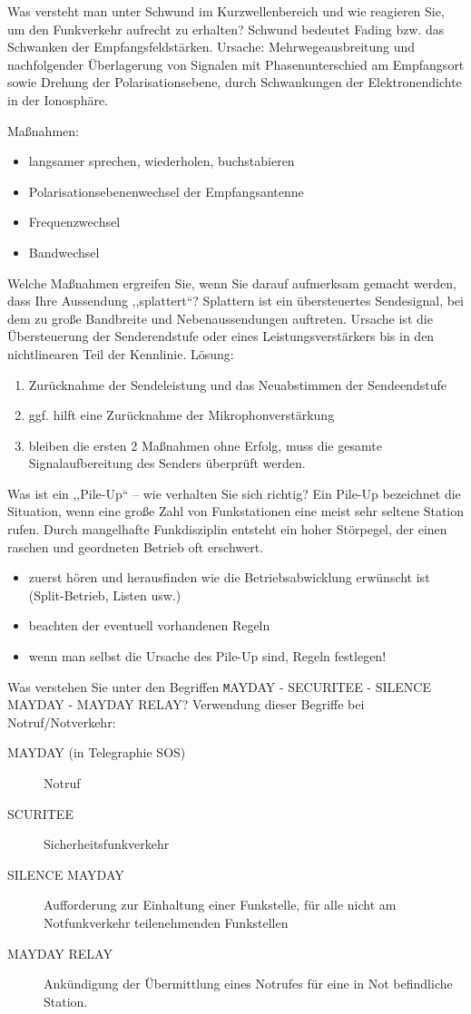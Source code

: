 \documentclass[avery5371,grid,frame,a4paper]{flashcards}
\newcommand{\card}[3]{
  \begin{flashcard}[{\chap} -- #1]{#2}#3\end{flashcard}
}
\begin{document}
\card{44}{Was versteht man unter Schwund im Kurzwellenbereich und wie reagieren Sie, um den Funkverkehr aufrecht zu erhalten?}{
  \small
  Schwund bedeutet Fading bzw. das Schwanken der Empfangsfeldstärken. Ursache: Mehrwegeausbreitung und nachfolgender Überlagerung von Signalen mit Phasenunterschied am Empfangsort sowie Drehung der Polarisationsebene, durch Schwankungen der Elektronendichte in der Ionosphäre.

  Maßnahmen:
  \begin{itemize}
    \item langsamer sprechen, wiederholen, buchstabieren
    \item Polarisationsebenenwechsel der Empfangsantenne
    \item Frequenzwechsel
    \item Bandwechsel
  \end{itemize}
}
\card{45}{Welche Maßnahmen ergreifen Sie, wenn Sie darauf aufmerksam gemacht werden, dass Ihre Aussendung ,,splattert``?}{
  \footnotesize
  Splattern ist ein übersteuertes Sendesignal, bei dem zu große Bandbreite und Nebenaussendungen auftreten. Ursache ist die Übersteuerung der Senderendstufe oder eines Leistungsverstärkers bis in den  nichtlinearen Teil der Kennlinie. Lösung:
  \begin{enumerate}
    \item Zurücknahme der Sendeleistung und das Neuabstimmen der Sendeendstufe
    \item ggf. hilft eine Zurücknahme der Mikrophonverstärkung
    \item bleiben die ersten 2 Maßnahmen ohne Erfolg, muss die gesamte Signalaufbereitung des Senders überprüft werden.
  \end{enumerate}
}
\card{46}{Was ist ein ,,Pile-Up`` -- wie verhalten Sie sich richtig?}{
  \small
  Ein Pile-Up bezeichnet die Situation, wenn eine große Zahl von Funkstationen eine meist sehr seltene Station rufen. Durch mangelhafte Funkdisziplin entsteht ein hoher Störpegel, der einen raschen und geordneten Betrieb oft erschwert.
  \begin{itemize}
    \item zuerst hören und herausfinden wie die Betriebsabwicklung erwünscht ist (Split-Betrieb, Listen usw.)
    \item beachten der eventuell vorhandenen Regeln
    \item wenn man selbst die Ursache des Pile-Up  sind, Regeln festlegen!
  \end{itemize}
}
\card{47}{Was verstehen Sie unter den Begriffen {\footnotesize\texttt MAYDAY - SECURITEE - SILENCE MAYDAY - MAYDAY RELAY?}}{
  \small
  Verwendung dieser Begriffe bei Notruf/Notverkehr:
  \begin{description}
    \item[MAYDAY (in Telegraphie SOS)] Notruf
    \item[SCURITEE] Sicherheitsfunkverkehr
    \item[SILENCE MAYDAY] Aufforderung zur Einhaltung einer Funkstelle, für alle nicht am Notfunkverkehr teilenehmenden Funkstellen
    \item[MAYDAY RELAY] Ankündigung der Übermittlung eines Notrufes für eine in Not befindliche Station.
  \end{description}
}
\end{document}
